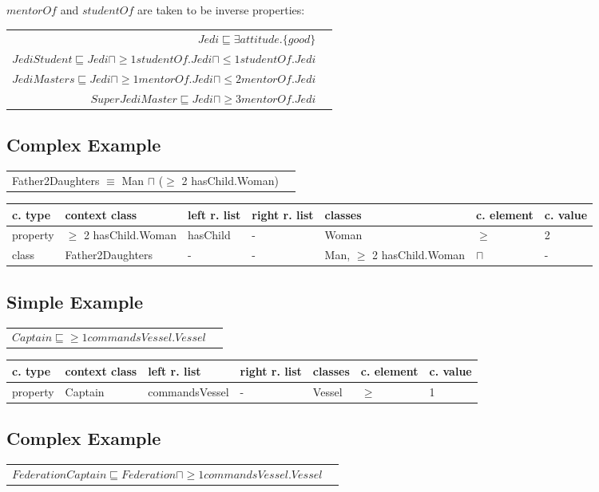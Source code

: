 \documentclass{llncs}
\newenvironment{gcotable}{
  \scriptsize
  \sffamily
  \vspace{0.3cm}
	\begin{center}
  \begin{tabular}{l|l|l|l|l|l|l}
  \hline
  \textbf{c. type} & \textbf{context class} & \textbf{left r. list} & \textbf{right r. list} & \textbf{classes} & \textbf{c. element} & \textbf{c. value} \\
  \hline

}{
  \hline
  \end{tabular}
	\end{center}
}
\newenvironment{DL}{
	\begin{center}
  \begin{tabular}{r l}

}{
  \end{tabular}
	\end{center}
}
\begin{document}
\noindent $mentorOf$ and $studentOf$ are taken to be inverse properties:\\

\begin{DL}
$Jedi \sqsubseteq \exists attitude.\{good\} $\\
$JediStudent \sqsubseteq Jedi \sqcap \geq1 studentOf.Jedi \sqcap \leq1 studentOf.Jedi$ \\
$JediMasters \sqsubseteq Jedi \sqcap \geq1 mentorOf.Jedi \sqcap \leq2 mentorOf.Jedi $\\
$SuperJediMaster \sqsubseteq Jedi \sqcap  \geq3 mentorOf.Jedi $
\end{DL}

\subsection{Complex Example}

\begin{DL}
Father2Daughters $\equiv$ Man $\sqcap$ ($\geq$ 2 hasChild.Woman)
\end{DL}

\begin{gcotable}
property & $\geq$ 2 hasChild.Woman & hasChild & - & Woman & $\geq$ & 2 \\
class & Father2Daughters & - & - & Man, $\geq$ 2 hasChild.Woman & $\sqcap$ & - \\
\end{gcotable}

\subsection{Simple Example}

\begin{DL}
$Captain \sqsubseteq \geq1 commandsVessel . Vessel $
\end{DL}

\begin{gcotable}
property & Captain & commandsVessel & - & Vessel & $\geq$ & 1 \\
\end{gcotable}

\subsection{Complex Example}

\begin{DL}
$FederationCaptain \sqsubseteq Federation \sqcap \geq1 commandsVessel . Vessel $
\end{DL}
\end{document}
